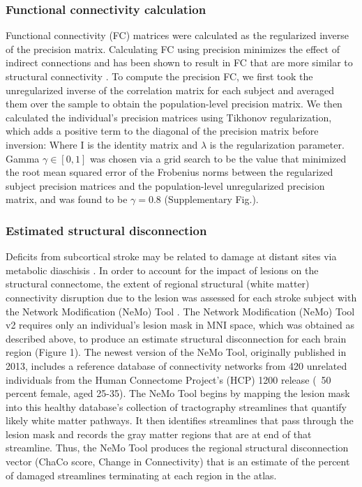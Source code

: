 \documentclass[10pt]{article}
\begin{document}
	\subsubsection*{Functional connectivity calculation}
	 Functional connectivity (FC) matrices were calculated as the regularized inverse of the precision matrix. Calculating FC using precision minimizes the effect of indirect connections and has been shown to result in FC that are more similar to structural connectivity \cite{Wodeyar2020-kz, Liegeois2020-ua}. To compute the precision FC, we first took the unregularized inverse of the correlation matrix for each subject and averaged them over the sample to obtain the population-level precision matrix. We then calculated the individual’s precision matrices using Tikhonov regularization, which adds a positive term to the diagonal of the precision matrix before inversion: 
	 Where I is the identity matrix and $ \lambda $ is the regularization parameter. Gamma $\gamma \in [0,1]$ was chosen via a grid search to be the value that minimized the root mean squared error of the Frobenius norms between the regularized subject precision matrices and the population-level unregularized precision matrix, and was found to be $\gamma = 0.8$ (Supplementary Fig.).
	
	\subsubsection*{Estimated structural disconnection}
	Deficits from subcortical stroke may be related to damage at distant sites via metabolic diaschisis \cite{Hillis2002-dz, Corbetta2015-ez}. In order to account for the impact of lesions on the structural connectome, the extent of regional structural (white matter) connectivity disruption due to the lesion was assessed for each stroke subject with the Network Modification (NeMo) Tool \cite{Kuceyeski2013-nk}. The Network Modification (NeMo) Tool v2 requires only an individual’s lesion mask in MNI space, which was obtained as described above, to produce an estimate structural disconnection for each brain region (Figure 1). The newest version of the NeMo Tool, originally published in 2013, includes a reference database of connectivity networks from 420 unrelated individuals from the Human Connectome Project’s (HCP) 1200 release (~50 percent female, aged 25-35). The NeMo Tool begins by mapping the lesion mask into this healthy database’s collection of tractography streamlines that quantify likely white matter pathways. It then identifies streamlines that pass through the lesion mask and records the gray matter regions that are at end of that streamline. Thus, the NeMo Tool produces the regional structural disconnection vector (ChaCo score, Change in Connectivity) that is an estimate of the percent of damaged streamlines terminating at each region in the atlas.
	
\end{document}
